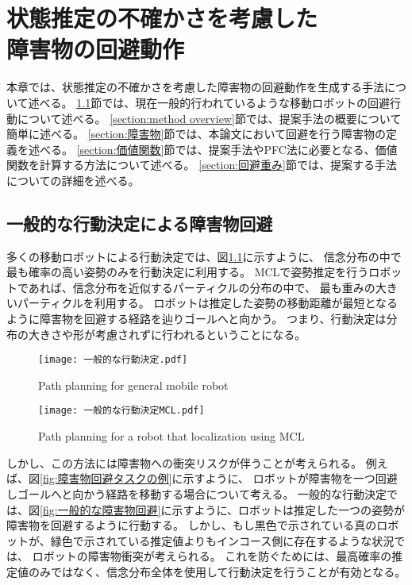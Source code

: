 \chapter{状態推定の不確かさを考慮した\\障害物の回避動作} \label{chapter:method}
本章では、状態推定の不確かさを考慮した障害物の回避動作を生成する手法について述べる。
\ref{section:一般的な回避}節では、現在一般的行われているような移動ロボットの回避行動について述べる。
\ref{section:method overview}節では、提案手法の概要について簡単に述べる。
\ref{section:障害物}節では、本論文において回避を行う障害物の定義を述べる。
\ref{section:価値関数}節では、提案手法やPFC法に必要となる、価値関数を計算する方法について述べる。
\ref{section:回避重み}節では、提案する手法についての詳細を述べる。


\section{一般的な行動決定による障害物回避} \label{section:一般的な回避}
多くの移動ロボットによる行動決定では、図\ref{fig:一般的な行動決定}に示すように、
信念分布の中で最も確率の高い姿勢のみを行動決定に利用する。
MCLで姿勢推定を行うロボットであれば、信念分布を近似するパーティクルの分布の中で、
最も重みの大きいパーティクルを利用する。
ロボットは推定した姿勢の移動距離が最短となるように障害物を回避する経路を辿りゴールへと向かう。
つまり、行動決定は分布の大きさや形が考慮されずに行われるということになる。

\begin{figure}[h]
  \begin{center}
    \texttt{[image: 一般的な行動決定.pdf]}
    \caption{Path planning for general mobile robot}
    \label{fig:一般的な行動決定}
  \end{center}
\end{figure}

\begin{figure}[h]
  \begin{center}
    \texttt{[image: 一般的な行動決定MCL.pdf]}
    \caption{Path planning for a robot that localization using MCL}
    \label{fig:一般的な行動決定MCL}
  \end{center}
\end{figure}

しかし、この方法には障害物への衝突リスクが伴うことが考えられる。
例えば、図\ref{fig:障害物回避タスクの例}に示すように、
ロボットが障害物を一つ回避しゴールへと向かう経路を移動する場合について考える。
一般的な行動決定では、図\ref{fig:一般的な障害物回避}に示すように、ロボットは推定した一つの姿勢が障害物を回避するように行動する。
しかし、もし黒色で示されている真のロボットが、緑色で示されている推定値よりもインコース側に存在するような状況では、
ロボットの障害物衝突が考えられる。
これを防ぐためには、最高確率の推定値のみではなく、信念分布全体を使用して行動決定を行うことが有効となる。

